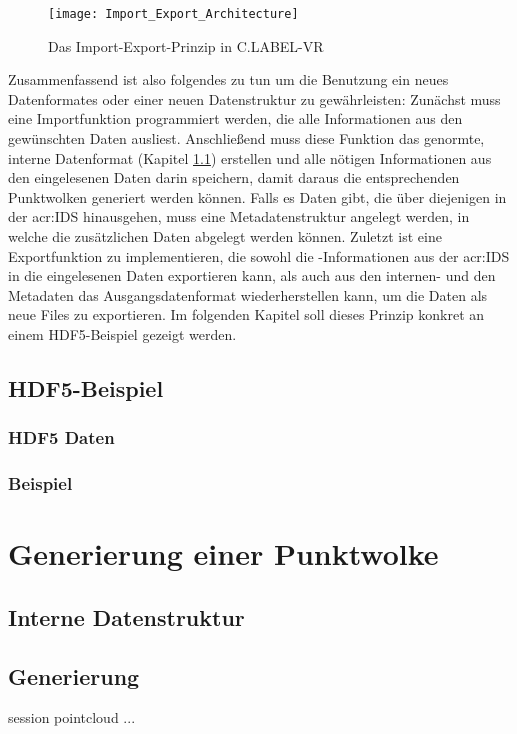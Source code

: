 \begin{figure}%
	\centering
    \texttt{[image: Import\_Export\_Architecture]}
    \caption{Das Import-Export-Prinzip in C.LABEL-VR}
    \label{fig:ImportExport}
\end{figure}

Zusammenfassend ist also folgendes zu tun um die Benutzung ein neues Datenformates oder einer neuen Datenstruktur zu gewährleisten: Zunächst muss eine Importfunktion programmiert werden, die alle Informationen aus den gewünschten Daten ausliest. Anschließend muss diese Funktion das genormte, interne Datenformat (Kapitel \ref{sec:IDS}) erstellen und alle nötigen Informationen aus den eingelesenen Daten darin speichern, damit daraus die entsprechenden Punktwolken generiert werden können. Falls es Daten gibt, die über diejenigen in der \acrshort{acr:IDS} hinausgehen, muss eine Metadatenstruktur angelegt werden, in welche die zusätzlichen Daten abgelegt werden können. Zuletzt ist eine Exportfunktion zu implementieren, die sowohl die -Informationen aus der \acrshort{acr:IDS} in die eingelesenen Daten exportieren kann, als auch aus den internen- und den Metadaten das Ausgangsdatenformat wiederherstellen kann, um die Daten als neue Files zu exportieren. Im folgenden Kapitel soll dieses Prinzip konkret an einem HDF5-Beispiel gezeigt werden.

\subsection{HDF5-Beispiel}
\subsubsection{HDF5 Daten}
\label{sec:HDF5}
\subsubsection{Beispiel}

\section{Generierung einer Punktwolke}
\label{sec:Generierung}

\subsection{Interne Datenstruktur}
\label{sec:IDS}

\subsection{Generierung}
\label{sec:PclGenerate}
session
pointcloud
...

